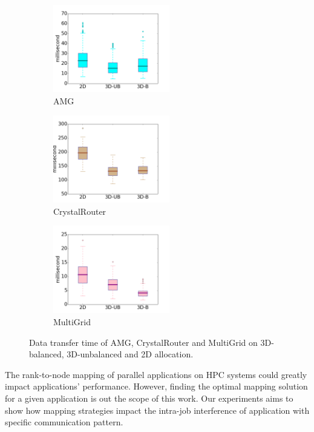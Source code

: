 \begin{figure}[t!]
    \centering
    \begin{subfigure}[t]{0.32\textwidth}
        \centering
        \includegraphics[height=1.5in]{figs/intra-job/shapestudy/amg_box}
        \caption{AMG}
        \label{fig:shapstudy-amg}
    \end{subfigure}%
    \hspace{1em}%
    \begin{subfigure}[t]{0.32\textwidth}
        \centering
        \includegraphics[height=1.5in]{figs/intra-job/shapestudy/cr_box}
        \caption{CrystalRouter}
        \label{fig:shapstudy-cr}
    \end{subfigure}%
    \begin{subfigure}[t]{0.32\textwidth}
        \centering
        \includegraphics[height=1.5in]{figs/intra-job/shapestudy/mg_box}
        \caption{MultiGrid}
        \label{fig:shapstudy-mg}
    \end{subfigure}%
   \caption{
   Data transfer time of AMG, CrystalRouter and MultiGrid on 3D-balanced, 
   3D-unbalanced and 2D allocation.
   }
   \label{fig:shapestudy}
\end{figure}


The rank-to-node mapping of parallel applications on HPC systems 
could greatly impact applications' performance. 
However, finding the optimal mapping solution for a given 
application is out the scope of this work. 
Our experiments aims to show how mapping strategies impact the 
intra-job interference of application with specific communication pattern.

